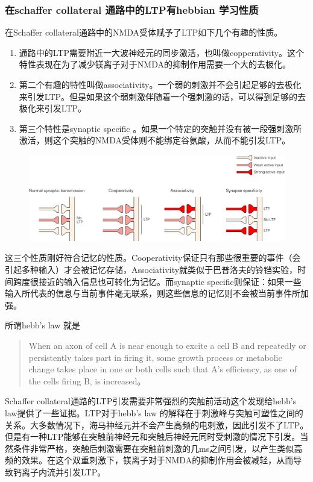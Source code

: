 \documentclass[UTF8,nofonts]{ctexart}
\begin{document}
\subsubsection{在schaffer collateral 通路中的LTP有hebbian 学习性质}
在Schaffer collateral通路中的NMDA受体赋予了LTP如下几个有趣的性质。
\begin{enumerate}
	\item 通路中的LTP需要附近一大波神经元的同步激活，也叫做copperativity。这个特性表现在为了减少镁离子对于NMDA的抑制作用需要一个大的去极化。
	\item  第二个有趣的特性叫做associativity。一个弱的刺激并不会引起足够的去极化来引发LTP。但是如果这个弱刺激伴随着一个强刺激的话，可以得到足够的去极化来引发LTP。
	\item 第三个特性是synaptic specific 。如果一个特定的突触并没有被一段强刺激所激活，则这个突触的NMDA受体则不能绑定谷氨酸，从而不能引发LTP。
\end{enumerate}
\begin{figure}[h]
	\centering
	\includegraphics[scale=0.8]{Pic/6706_PNS5.jpg}
\end{figure}	
这三个性质刚好符合记忆的性质。Cooperativity保证只有那些很重要的事件（会引起多种输入）才会被记忆存储，Associativity就类似于巴普洛夫的铃铛实验，时间跨度很接近的输入信息也可转化为记忆。而synaptic specific则保证：如果一些输入所代表的信息与当前事件毫无联系，则这些信息的记忆则不会被当前事件所加强。
\par
所谓hebb's law 就是
\begin{quote}
	When an axon of cell A is near enough to excite a cell B and repeatedly or persistently takes part in firing it, some growth process or metabolic change takes place in one or both cells such that A's efficiency, as one of the cells firing B, is increased。
	\end{quote}
Schaffer collateral通路的LTP引发需要非常强烈的突触前活动这个发现给hebb's law提供了一些证据。LTP对于hebb's law 的解释在于刺激峰与突触可塑性之间的关系。大多数情况下，海马神经元并不会产生高频的电刺激，因此引发不了LTP。但是有一种LTP能够在突触前神经元和突触后神经元同时受刺激的情况下引发。当然条件非常严格，突触后刺激需要在突触前刺激的几ms之间引发，以产生类似高频的效果。在这个双重刺激下，镁离子对于NMDA的抑制作用会被减轻，从而导致钙离子内流并引发LTP。
\end{document}
